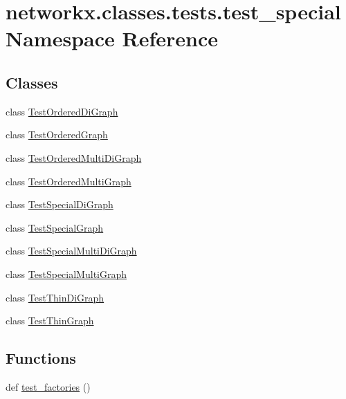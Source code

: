 \hypertarget{namespacenetworkx_1_1classes_1_1tests_1_1test__special}{}\section{networkx.\+classes.\+tests.\+test\+\_\+special Namespace Reference}
\label{namespacenetworkx_1_1classes_1_1tests_1_1test__special}
\subsection*{Classes}
\begin{DoxyCompactItemize}
\item 
class \hyperlink{classnetworkx_1_1classes_1_1tests_1_1test__special_1_1TestOrderedDiGraph}{Test\+Ordered\+Di\+Graph}
\item 
class \hyperlink{classnetworkx_1_1classes_1_1tests_1_1test__special_1_1TestOrderedGraph}{Test\+Ordered\+Graph}
\item 
class \hyperlink{classnetworkx_1_1classes_1_1tests_1_1test__special_1_1TestOrderedMultiDiGraph}{Test\+Ordered\+Multi\+Di\+Graph}
\item 
class \hyperlink{classnetworkx_1_1classes_1_1tests_1_1test__special_1_1TestOrderedMultiGraph}{Test\+Ordered\+Multi\+Graph}
\item 
class \hyperlink{classnetworkx_1_1classes_1_1tests_1_1test__special_1_1TestSpecialDiGraph}{Test\+Special\+Di\+Graph}
\item 
class \hyperlink{classnetworkx_1_1classes_1_1tests_1_1test__special_1_1TestSpecialGraph}{Test\+Special\+Graph}
\item 
class \hyperlink{classnetworkx_1_1classes_1_1tests_1_1test__special_1_1TestSpecialMultiDiGraph}{Test\+Special\+Multi\+Di\+Graph}
\item 
class \hyperlink{classnetworkx_1_1classes_1_1tests_1_1test__special_1_1TestSpecialMultiGraph}{Test\+Special\+Multi\+Graph}
\item 
class \hyperlink{classnetworkx_1_1classes_1_1tests_1_1test__special_1_1TestThinDiGraph}{Test\+Thin\+Di\+Graph}
\item 
class \hyperlink{classnetworkx_1_1classes_1_1tests_1_1test__special_1_1TestThinGraph}{Test\+Thin\+Graph}
\end{DoxyCompactItemize}
\subsection*{Functions}
\begin{DoxyCompactItemize}
\item 
def \hyperlink{namespacenetworkx_1_1classes_1_1tests_1_1test__special_ace27442e007d8d7943b31d1829c5e9f7}{test\+\_\+factories} ()
\end{DoxyCompactItemize}


